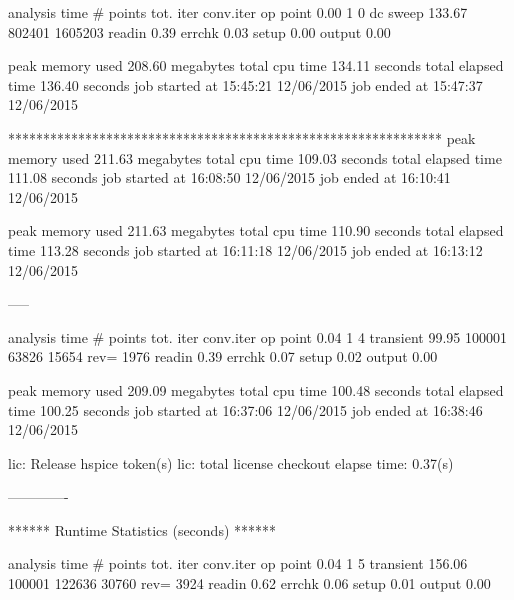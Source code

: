   analysis           time    # points   tot. iter  conv.iter
  op point           0.00           1           0
  dc sweep         133.67      802401     1605203
  readin             0.39
  errchk             0.03
  setup              0.00
  output             0.00


           peak memory used        208.60 megabytes
           total cpu time          134.11 seconds
           total elapsed time      136.40 seconds
           job started at     15:45:21 12/06/2015
           job ended   at     15:47:37 12/06/2015
           
           
**************************************************************
           peak memory used        211.63 megabytes
           total cpu time          109.03 seconds
           total elapsed time      111.08 seconds
           job started at     16:08:50 12/06/2015
           job ended   at     16:10:41 12/06/2015
           
                      peak memory used        211.63 megabytes
           total cpu time          110.90 seconds
           total elapsed time      113.28 seconds
           job started at     16:11:18 12/06/2015
           job ended   at     16:13:12 12/06/2015
           
           -----
           

  analysis           time    # points   tot. iter  conv.iter
  op point           0.04           1           4
  transient         99.95      100001       63826       15654 rev=      1976
  readin             0.39
  errchk             0.07
  setup              0.02
  output             0.00


           peak memory used        209.09 megabytes
           total cpu time          100.48 seconds
           total elapsed time      100.25 seconds
           job started at     16:37:06 12/06/2015
           job ended   at     16:38:46 12/06/2015


 lic: Release hspice token(s) 
 lic: total license checkout elapse time:        0.37(s)
 
 -------------           

  ******  Runtime Statistics (seconds)  ******

  analysis           time    # points   tot. iter  conv.iter
  op point           0.04           1           5
  transient        156.06      100001      122636       30760 rev=      3924
  readin             0.62
  errchk             0.06
  setup              0.01
  output             0.00


